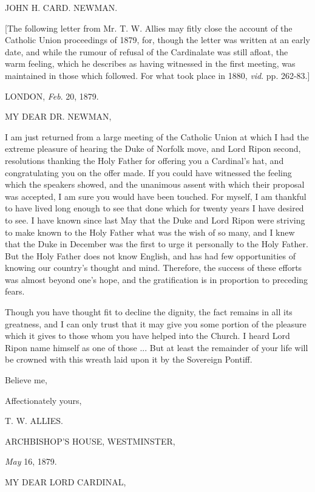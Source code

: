 JOHN H. CARD. NEWMAN.

[The following letter from Mr. T. W. Allies may fitly close the
account of the Catholic Union proceedings of 1879, for, though the
letter was written at an early date, and while the rumour of refusal
of the Cardinalate was still afloat, the warm feeling, which he
describes as having witnessed in the first meeting, was maintained in
those which followed. For what took place in 1880, \emph{vid}. pp.
262-83.]

LONDON, \emph{Feb}. 20, 1879.

MY DEAR DR.
NEWMAN,

I am just returned from a large meeting of the Catholic Union at which
I had the extreme pleasure of hearing the Duke of Norfolk move, and
Lord Ripon second, resolutions thanking the Holy Father for offering
you a Cardinal's hat, and congratulating you on the offer made. If you
could have witnessed the feeling which the speakers showed, and the
unanimous assent with which their proposal was accepted, I am sure you
would have been touched. For myself, I am thankful to have lived long
enough to see that done which for twenty years I have desired to see.
I have known since last May that the Duke and Lord Ripon were striving
to make known to the Holy Father what was the wish of so many, and I
knew that the Duke in December was the first to urge it personally to
the Holy Father. But the Holy Father does not know English, and has
had few opportunities of knowing our country's thought and mind.
Therefore, the success of these efforts was almost beyond one's hope,
and the gratification is in proportion to preceding fears.

Though you have thought fit to decline the dignity, the fact
remains in all its greatness, and I can only trust that it may give
you some portion of the pleasure which it gives to those whom you have
helped into the Church. I heard Lord Ripon name himself as one of those ... But at least the remainder of your life will be crowned with
this wreath laid upon it by the Sovereign Pontiff.

Believe me,

Affectionately yours,

T. W. ALLIES.


ARCHBISHOP'S HOUSE, WESTMINSTER,

\emph{May} 16, 1879.

MY DEAR LORD
CARDINAL,

